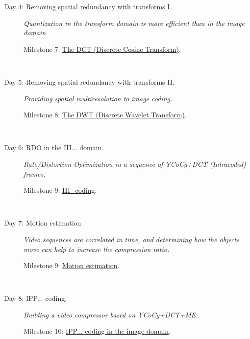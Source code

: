 \begin{description}
\item [Day 4: {\normalfont Removing spatial redundancy with transforms I.}]
  \emph{Quantization in the transform domain is more efficient than in the image domain.}
  \begin{description}
  \item [Milestone 7: {\normalfont \href{https://sistemas-multimedia.github.io/milestones/07-DCT/}{The DCT (Discrete Cosine Transform)}.}]
  \end{description}
  ~\newline

\item [Day 5: {\normalfont Removing spatial redundancy with transforms II.}]
  \emph{Providing spatial multiresolution to image coding.}
  \begin{description}
  \item [Milestone 8: {\normalfont \href{https://sistemas-multimedia.github.io/milestones/08-DWT/}{The DWT (Discrete Wavelet Transform)}.}]
  \end{description}
  ~\newline

\item [Day 6: {\normalfont RDO in the III... domain.}]
  \emph{Rate/Distortion Optimization in a sequence of YCoCg+DCT
  (Intracoded) frames.}
  \begin{description}
  \item [Milestone 9: {\normalfont \href{https://sistemas-multimedia.github.io/milestones/09-III/}{III\_coding}.}]
  \end{description}
  ~\newline

\item [Day 7: {\normalfont Motion estimation.}]
  \emph{Video sequences are correlated in time, and determining how the objects move can help to increase the compression ratio.}
  \begin{description}
  \item [Milestone 9: {\normalfont \href{https://sistemas-multimedia.github.io/milestones/10-ME/}{Motion estimation}.}]
  \end{description}
  ~\newline

\item [Day 8: {\normalfont IPP... coding.}]
  \emph{Building a video compressor based on YCoCg+DCT+ME.}
  \begin{description}
  \item [Milestone 10: {\normalfont \href{https://sistemas-multimedia.github.io/milestones/11-image_domain_IPP/}{IPP... coding in the image domain}.}]
  \end{description}
  ~\newline


\end{description}
